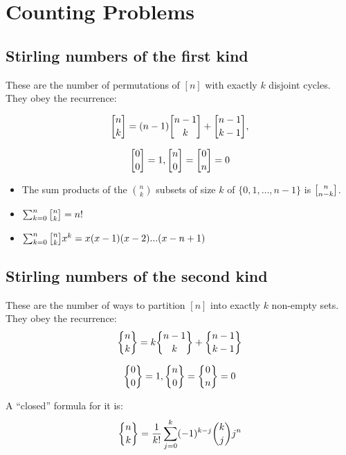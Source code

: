 \section{Counting Problems}

\subsection{Stirling numbers of the first kind} These are the number of permutations of $[n]$ with exactly $k$ disjoint cycles. They obey the recurrence:

  \begin{equation*}
    \stirlingfirst{n}{k} = (n-1)\stirlingfirst{n-1}{k} + \stirlingfirst{n-1}{k-1},
  \end{equation*}
  
  \begin{equation*}
    \stirlingfirst{0}{0} = 1, \stirlingfirst{n}{0} = \stirlingfirst{0}{n} = 0
  \end{equation*}
  
\begin{itemize}
    \item The sum products of the $\binom{n}{k}$ subsets of size $k$ of $\{0, 1, \dots, n-1\}$ is $\stirlingfirst{n}{n-k}$.
    
    \item $\sum_{k=0}^n \stirlingfirst{n}{k} = n!$

    \item $\sum_{k=0}^{n}\stirlingfirst{n}{k}x^k = x(x-1)(x-2)...(x-n+1)$
\end{itemize}

\subsection{Stirling numbers of the second kind} These are the number of ways to partition $[n]$ into exactly $k$ non-empty sets. They obey the recurrence:
  \begin{equation*}
    \stirlingsecond{n}{k} = k\stirlingsecond{n-1}{k} + \stirlingsecond{n-1}{k-1}
  \end{equation*}
  
  \begin{equation*}
    \stirlingsecond{0}{0} = 1, \stirlingsecond{n}{0} = \stirlingsecond{0}{n} = 0
  \end{equation*}

  A ``closed'' formula for it is:
  \begin{equation*}
    \stirlingsecond{n}{k} = \frac{1}{k!}\sum_{j=0}^k (-1)^{k-j} \binom{k}{j} j^n
  \end{equation*}

